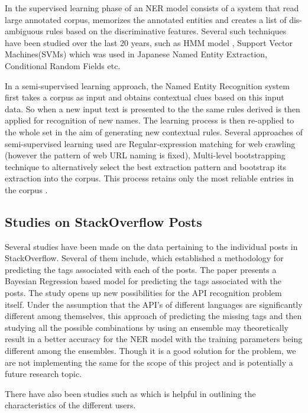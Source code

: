 \documentclass{sig-alternate-05-2015}
\begin{document}
In the supervised learning phase of an NER model consists of a system that read large annotated corpus, memorizes the annotated entities and creates a list of dis-ambiguous rules based on the discriminative features. Several such techniques have been studied over the last 20 years, such as HMM model \cite{bickel1998efficient},  Support Vector Machines(SVMs) \cite{asahara2003japanese} which was used in Japanese Named Entity Extraction, Conditional Random Fields \cite{okanohara2006improving} etc.

In a semi-supervised learning approach, the Named Entity Recognition system first takes a corpus as input and obtains contextual clues based on this input data. So when a new input text is presented to the the same rules derived is then applied for recognition of new names. The learning process is then re-applied to the whole set in the aim of generating new contextual rules. Several approaches of semi-supervised learning used are Regular-expression matching \cite{brin2012reprint} for web crawling (however the pattern of web URL naming is fixed), Multi-level bootstrapping technique to alternatively select the best extraction pattern and bootstrap its extraction into the corpus. This process retains only the most reliable entries in the corpus \cite{riloff1999learning}.


\subsection{Studies on StackOverflow Posts}
Several studies have been made on the data pertaining to the individual posts in StackOverflow. Several of them include, \cite{stanley2013predicting} which established a methodology for predicting the tags associated with each of the posts. The paper presents a Bayesian Regression based model for predicting the tags associated with the posts. The study opens up new possibilities for the API recognition problem itself. Under the assumption that the API's of different languages are significantly different among themselves, this approach of predicting the missing tags and then studying all the possible combinations by using an ensemble may theoretically result in a better accuracy for the NER model with the training parameters being different among the ensembles. Though it is a good solution for the problem, we are not implementing the same for the scope of this project and is potentially a future research topic.

There have also been studies such as \cite{bazelli2013personality} which is helpful in outlining the characteristics of the different users.
\end{document}

